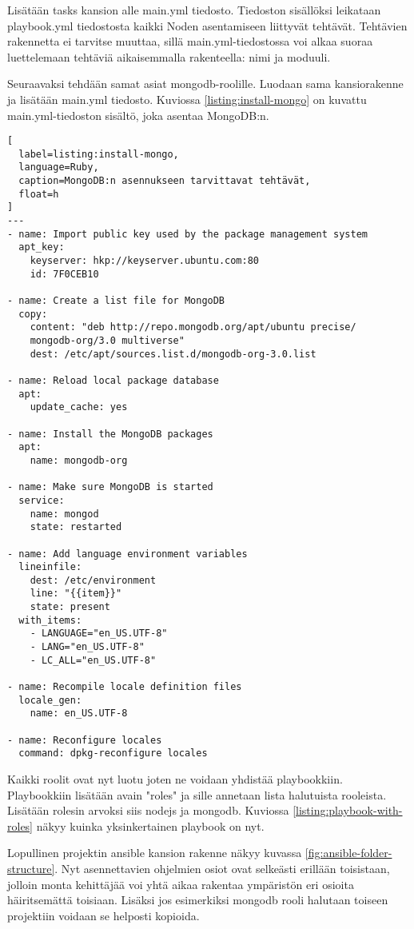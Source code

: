 Lisätään tasks kansion alle main.yml tiedosto. Tiedoston sisällöksi leikataan playbook.yml tiedostosta kaikki Noden asentamiseen liittyvät tehtävät. Tehtävien rakennetta ei tarvitse muuttaa, sillä main.yml-tiedostossa voi alkaa suoraa luettelemaan tehtäviä aikaisemmalla rakenteella: nimi ja moduuli.

Seuraavaksi tehdään samat asiat mongodb-roolille. Luodaan sama kansiorakenne ja lisätään main.yml tiedosto. Kuviossa \ref{listing:install-mongo} on kuvattu main.yml-tiedoston sisältö, joka asentaa MongoDB:n.

\begin{lstlisting}[
  label=listing:install-mongo,
  language=Ruby,
  caption=MongoDB:n asennukseen tarvittavat tehtävät,
  float=h
]
---
- name: Import public key used by the package management system
  apt_key:
    keyserver: hkp://keyserver.ubuntu.com:80
    id: 7F0CEB10

- name: Create a list file for MongoDB
  copy:
    content: "deb http://repo.mongodb.org/apt/ubuntu precise/
    mongodb-org/3.0 multiverse"
    dest: /etc/apt/sources.list.d/mongodb-org-3.0.list

- name: Reload local package database
  apt:
    update_cache: yes

- name: Install the MongoDB packages
  apt:
    name: mongodb-org

- name: Make sure MongoDB is started
  service:
    name: mongod
    state: restarted

- name: Add language environment variables
  lineinfile:
    dest: /etc/environment
    line: "{{item}}"
    state: present
  with_items:
    - LANGUAGE="en_US.UTF-8"
    - LANG="en_US.UTF-8"
    - LC_ALL="en_US.UTF-8"

- name: Recompile locale definition files
  locale_gen:
    name: en_US.UTF-8

- name: Reconfigure locales
  command: dpkg-reconfigure locales
\end{lstlisting}

Kaikki roolit ovat nyt luotu joten ne voidaan yhdistää playbookkiin. Playbookkiin lisätään avain "roles" ja sille annetaan lista halutuista rooleista. Lisätään rolesin arvoksi siis nodejs ja mongodb. Kuviossa \ref{listing:playbook-with-roles} näkyy kuinka yksinkertainen playbook on nyt.

Lopullinen projektin ansible kansion rakenne näkyy kuvassa \ref{fig:ansible-folder-structure}. Nyt asennettavien ohjelmien osiot ovat selkeästi erillään toisistaan, jolloin monta kehittäjää voi yhtä aikaa rakentaa ympäristön eri osioita häiritsemättä toisiaan. Lisäksi jos esimerkiksi mongodb rooli halutaan toiseen projektiin voidaan se helposti kopioida.

